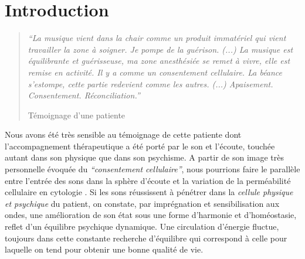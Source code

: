 
\chapter{Introduction}





\begin{quotation}
 \textit{``La musique vient dans la chair comme un produit immatériel
 qui vient travailler la zone à soigner. Je pompe de la
 guérison.
 (...)
 La musique est équilibrante et guérisseuse, ma zone
 anesthésiée se remet à vivre, elle est remise en activité.
 Il y a comme un consentement cellulaire.
La béance s'estompe, cette
partie redevient comme les autres. (...)
Apaisement. Consentement. Réconciliation.''}

Témoignage d'une patiente

\end{quotation}



Nous avons été très sensible au témoignage de cette patiente dont l'accompagnement thérapeutique a 
été porté par le son et l'écoute, touchée autant dans son physique que dans son psychisme.
A partir de son image très personnelle évoquée du \textit{``consentement cellulaire''}, nous pourrions 
faire le
parallèle entre l'entrée des sons dans la sphère d'écoute et la variation de la
perméabilité cellulaire en cytologie \cite{marieb:biologie}. Si les sons réussissent à pénétrer dans la
\textit{cellule physique et psychique} du patient,  on constate, par 
imprégnation et sensibilisation aux ondes,
une amélioration de son état %
sous une forme d'harmonie et d'homéostasie,  
\autocite[10]{marieb:biologie} 
reflet d'un équilibre psychique dynamique.  
Une circulation d'énergie  fluctue, toujours dans cette  constante recherche d'équilibre qui 
correspond  à celle pour laquelle on tend pour obtenir  une bonne qualité de vie.



